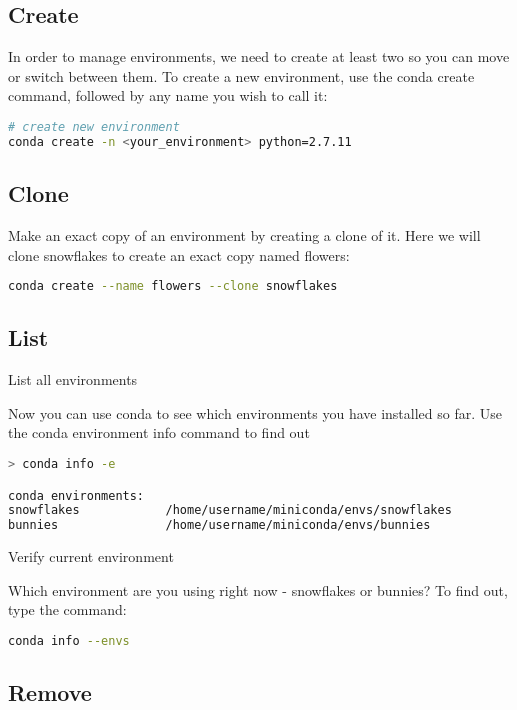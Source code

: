 \subsection{Create}

In order to manage environments, we need to create at least two so you can move or switch between them. To create a new environment, use the conda create command, followed by any name you wish to call it:

\begin{lstlisting}[language=Bash]
# create new environment
conda create -n <your_environment> python=2.7.11
\end{lstlisting}

\subsection{Clone}

Make an exact copy of an environment by creating a clone of it. Here we will clone snowflakes to create an exact copy named flowers:

\begin{lstlisting}[language=bash]
conda create --name flowers --clone snowflakes
\end{lstlisting}

\subsection{List}

List all environments

Now you can use conda to see which environments you have installed so far. Use the conda environment info command to find out

\begin{lstlisting}[language=bash]
> conda info -e

conda environments:
snowflakes            /home/username/miniconda/envs/snowflakes
bunnies               /home/username/miniconda/envs/bunnies
\end{lstlisting}

Verify current environment

Which environment are you using right now - snowflakes or bunnies? To find out, type the command:

\begin{lstlisting}[language=bash]
conda info --envs
\end{lstlisting}


\subsection{Remove}

